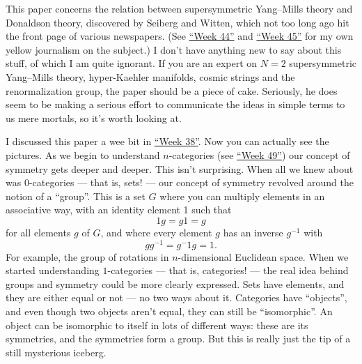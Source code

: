 \documentclass{article}
\def\tightlist{}
\renewcommand{\texttt}[1]{%
  \begingroup
  \ttfamily
  \begingroup\lccode`~=`/\lowercase{\endgroup\def~}{/\discretionary{}{}{}}%
  \begingroup\lccode`~=`[\lowercase{\endgroup\def~}{[\discretionary{}{}{}}%
  \begingroup\lccode`~=`.\lowercase{\endgroup\def~}{.\discretionary{}{}{}}%
  \catcode`/=\active\catcode`[=\active\catcode`.=\active
  \scantokens{#1\noexpand}%
  \endgroup
}
\begin{document}

This paper concerns the relation between supersymmetric Yang--Mills
theory and Donaldson theory, discovered by Seiberg and Witten, which not
too long ago hit the front page of various newspapers. (See
\protect\hyperlink{week44}{``Week 44''} and
\protect\hyperlink{week45}{``Week 45''} for my own yellow journalism on
the subject.) I don't have anything new to say about this stuff, of
which I am quite ignorant. If you are an expert on \(N = 2\)
supersymmetric Yang--Mills theory, hyper-Kaehler manifolds, cosmic
strings and the renormalization group, the paper should be a piece of
cake. Seriously, he does seem to be making a serious effort to
communicate the ideas in simple terms to us mere mortals, so it's worth
looking at.


I discussed this paper a wee bit in \protect\hyperlink{week38}{``Week
38''}. Now you can actually see the pictures. As we begin to understand
\(n\)-categories (see \protect\hyperlink{week49}{``Week 49''}) our
concept of symmetry gets deeper and deeper. This isn't surprising. When
all we knew about was 0-categories --- that is, sets! --- our concept of
symmetry revolved around the notion of a ``group''. This is a set \(G\)
where you can multiply elements in an associative way, with an identity
element 1 such that \[1g = g1 = g\] for all elements \(g\) of \(G\), and
where every element \(g\) has an inverse \(g^{-1}\) with
\[gg^{-1} = g{^-1}g = 1.\] For example, the group of rotations in
\(n\)-dimensional Euclidean space. When we started understanding
\(1\)-categories --- that is, categories! --- the real idea behind
groups and symmetry could be more clearly expressed. Sets have elements,
and they are either equal or not --- no two ways about it. Categories
have ``objects'', and even though two objects aren't equal, they can
still be ``isomorphic''. An object can be isomorphic to itself in lots
of different ways: these are its symmetries, and the symmetries form a
group. But this is really just the tip of a still mysterious iceberg.
\end{document}

